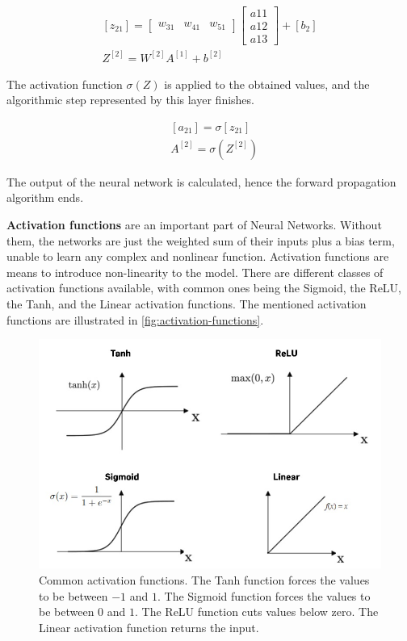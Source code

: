 \begin{equation}
\begin{gathered}
{\left[z_{21}\right]=\left[\begin{array}{lll}
w_{31} & w_{41} & w_{51}
\end{array}\right]\left[\begin{array}{l}
a 11 \\
a 12 \\
a 13
\end{array}\right]+\left[b_{2}\right]} \\
Z^{[2]}=W^{[2]} A^{[1]}+b^{[2]}
\end{gathered}
\end{equation}

\noindent The activation function $\sigma(Z)$ is applied to the obtained values, and the algorithmic step represented by this layer finishes.

\begin{equation}
\begin{aligned}
&{\left[a_{21}\right]=\sigma\left[z_{21}\right]} \\
&A^{[2]}=\sigma\left(Z^{[2]}\right)
\end{aligned}
\end{equation}

\noindent The output of the neural network is calculated, hence the forward propagation algorithm ends.

\textbf{Activation functions} are an important part of Neural Networks.
Without them, the networks are just the weighted sum of their inputs plus a bias term, unable to learn any complex and nonlinear function.
Activation functions are means to introduce non-linearity to the model.
There are different classes of activation functions available, with common ones being the Sigmoid, the ReLU, the Tanh, and the Linear activation functions.
The mentioned activation functions are illustrated in \autoref{fig:activation-functions}.

\begin{figure}[h]
	\centering
	\includegraphics[width=0.9\linewidth]{images/approaches/deep_learning/activation_functions_f.jpg}
	\caption{Common activation functions. The Tanh function forces the values to be between $-1$ and $1$. The Sigmoid function forces the values to be between $0$ and $1$. The ReLU function cuts values below zero. The Linear activation function returns the input.}
	\label{fig:activation-functions}
\end{figure}

